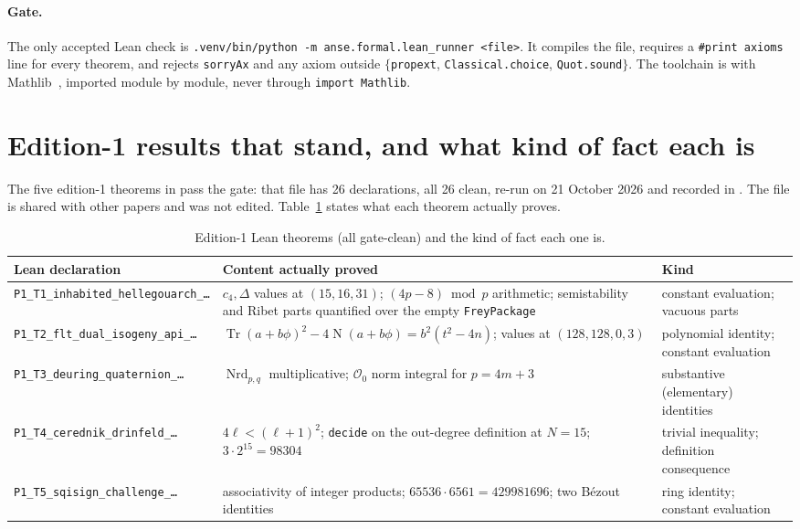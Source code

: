 \documentclass[11pt,a4paper]{article}
\theoremstyle{definition}
\newcommand{\Oz}{\mathcal{O}_0}
\newcommand{\Nrd}{\operatorname{Nrd}}
\begin{document}
\paragraph{Gate.} The only accepted Lean check is \texttt{.venv/bin/python -m anse.formal.lean\_runner <file>}. It compiles the file, requires a \texttt{\#print axioms} line for every theorem, and rejects \texttt{sorryAx} and any axiom outside $\{$\texttt{propext}, \texttt{Classical.choice}, \texttt{Quot.sound}$\}$. The toolchain is  with Mathlib~\cite{Mathlib}, imported module by module, never through \texttt{import Mathlib}.

\section{Edition-1 results that stand, and what kind of fact each is}
\label{sec:formal}
The five edition-1 theorems in  pass the gate: that file has 26 declarations, all 26 clean, re-run on 21 October 2026 and recorded in . The file is shared with other papers and was not edited. Table~\ref{tab:kinds} states what each theorem actually proves.

\begin{table}[htbp]
\centering
\caption{Edition-1 Lean theorems (all gate-clean) and the kind of fact each one is.}
\label{tab:kinds}
\footnotesize
\begin{tabularx}{\textwidth}{@{}l X l@{}}
\toprule
\textbf{Lean declaration} & \textbf{Content actually proved} & \textbf{Kind} \\
\midrule
\texttt{P1\_T1\_inhabited\_hellegouarch\_\dots} & $c_4,\Delta$ values at $(15,16,31)$; $(4p-8)\bmod p$ arithmetic; semistability and Ribet parts quantified over the empty \texttt{FreyPackage} & constant evaluation; vacuous parts \\
\texttt{P1\_T2\_flt\_dual\_isogeny\_api\_\dots} & $\operatorname{Tr}(a+b\phi)^2-4\operatorname N(a+b\phi)=b^2(t^2-4n)$; values at $(128,128,0,3)$ & polynomial identity; constant evaluation \\
\texttt{P1\_T3\_deuring\_quaternion\_\dots} & $\Nrd_{p,q}$ multiplicative; $\Oz$ norm integral for $p=4m+3$ & substantive (elementary) identities \\
\texttt{P1\_T4\_cerednik\_drinfeld\_\dots} & $4\ell<(\ell+1)^2$; \texttt{decide} on the out-degree definition at $N=15$; $3\cdot2^{15}=98304$ & trivial inequality; definition consequence \\
\texttt{P1\_T5\_sqisign\_challenge\_\dots} & associativity of integer products; $65536\cdot6561=429981696$; two B\'ezout identities & ring identity; constant evaluation \\
\bottomrule
\end{tabularx}
\end{table}
\end{document}
